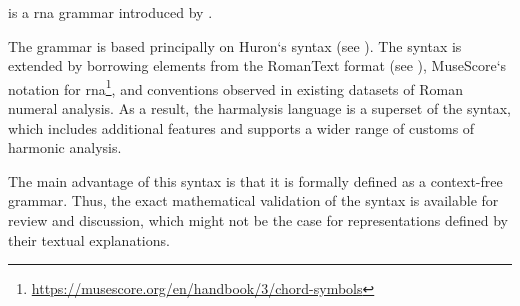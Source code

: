 

 is a \gls{rna} grammar introduced by
\textcite{napoleslopez2020harmalysis}.

The  grammar is based principally on
Huron‘s  syntax (see
). The syntax is extended by
borrowing elements from the RomanText format (see
), MuseScore‘s notation for
\gls{rna}\footnote{\href{https://musescore.org/en/handbook/3/chord-symbols\#rna}{https://musescore.org/en/handbook/3/chord-symbols}},
and conventions observed in existing datasets of Roman
numeral analysis.  As  a result,  the harmalysis language is
a superset  of  the  syntax,  which includes
additional features and supports a wider range of customs of
harmonic analysis.

The main advantage of this syntax is that it is formally
defined as a context-free grammar. Thus, the exact
mathematical validation of the syntax is available for
review and discussion, which might not be the case for
representations defined by their textual explanations.
